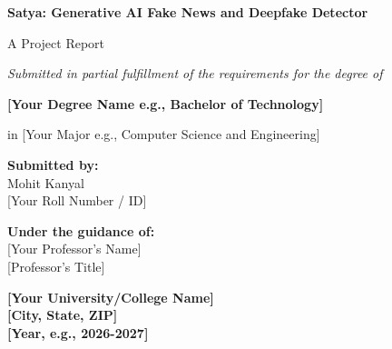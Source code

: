 \documentclass[12pt, a4paper]{report}
\begin{document}
\begin{titlepage}
    \begin{center}
        \vspace*{1in}
        
        \Huge
        \textbf{Satya: Generative AI Fake News and Deepfake Detector}
        
        \vspace{0.5in}
        \LARGE
        A Project Report
        
        \vspace{0.5in}
        \textit{Submitted in partial fulfillment of the requirements for the degree of}
        
        \vspace{0.2in}
        \Large
        \textbf{[Your Degree Name e.g., Bachelor of Technology]}
        
        \vspace{0.1in}
        \normalsize
        in [Your Major e.g., Computer Science and Engineering]
        
        \vspace{0.8in}
        
        \Large
        \textbf{Submitted by:} \\
        Mohit Kanyal \\
        {[Your Roll Number / ID]}
        
        \vspace{0.8in}
        
        \Large
        \textbf{Under the guidance of:} \\
        {[Your Professor's Name]} \\
        {[Professor's Title]}
        
        \vfill
        
        
        \Large
        \textbf{[Your University/College Name]} \\
        \textbf{[City, State, ZIP]} \\
        \textbf{[Year, e.g., 2026-2027]}
        
    \end{center}
\end{titlepage}


\newpage
\end{document}

